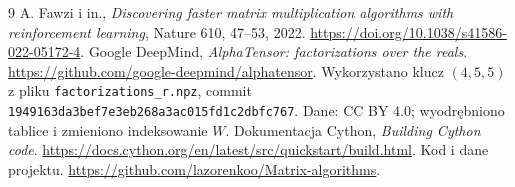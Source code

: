 \documentclass[11pt,a4paper]{article}
\begin{document}
\begin{thebibliography}{9}
A. Fawzi i in., \emph{Discovering faster matrix multiplication algorithms
with reinforcement learning}, Nature 610, 47--53, 2022.
\url{https://doi.org/10.1038/s41586-022-05172-4}.
Google DeepMind, \emph{AlphaTensor: factorizations over the reals}.
\url{https://github.com/google-deepmind/alphatensor}.
Wykorzystano klucz $(4,5,5)$ z pliku \texttt{factorizations\_r.npz},
commit \texttt{1949163da3bef7e3eb268a3ac015fd1c2dbfc767}.
Dane: CC BY 4.0; wyodrębniono tablice i zmieniono indeksowanie $W$.
Dokumentacja Cython, \emph{Building Cython code}.
\url{https://docs.cython.org/en/latest/src/quickstart/build.html}.
Kod i dane projektu.
\url{https://github.com/lazorenkoo/Matrix-algorithms}.
\end{thebibliography}
\end{document}

